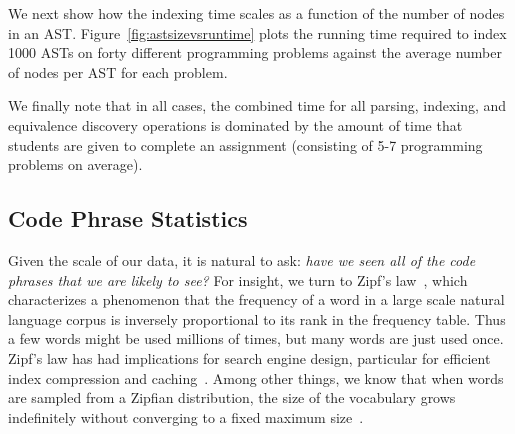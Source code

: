 We next show how the indexing time scales as a function of the number of nodes in an AST.
Figure~\ref{fig:astsizevsruntime} plots the running time required to index 1000 ASTs 
on forty different programming problems against the average number of nodes per AST for each problem.


We finally note that in all cases, the combined time for all parsing, indexing, and equivalence discovery operations
is dominated by the amount of time that students are given to complete an assignment (consisting of 5-7 programming problems on average).

\subsection{Code Phrase Statistics}
Given the scale of our data, it is natural to ask:  \emph{have we seen all of the code phrases that we are likely to see?}
For insight, we turn to Zipf's law~\cite{zipf1949human}, which characterizes a phenomenon that
 the frequency of a word in a large scale natural language corpus
is inversely proportional to its rank in the frequency table. 
Thus a few words might be used millions of times,
but many words are just used once. 
Zipf's law has had implications for search engine design, particular for efficient index compression and caching~\cite{breslau99}.
Among other things, we know that when words are sampled from a Zipfian distribution, the size of the vocabulary grows
indefinitely without converging to a fixed maximum size~\cite{lu10}.

